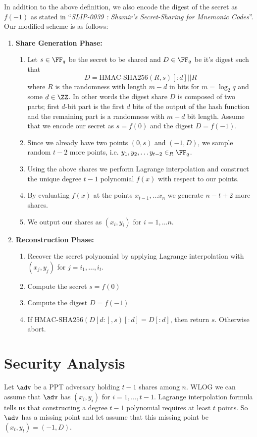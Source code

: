 \documentclass[envcountsame,runningheads,notitlepage]{llncs}
\begin{document}
	In addition to the above definition, we also encode the digest of the secret as $f(-1)$ as stated in ``\textit{SLIP-0039 : Shamir's Secret-Sharing for Mnemonic Codes}''. Our modified scheme is as follows:
	\begin{enumerate}
		\item \textbf{Share Generation Phase:}  
			\begin{enumerate}
				\item Let $s \in \FF_q$ be the secret to be shared and $D \in \FF_q$ be it's digest such that 
				\begin{equation*}
				D = \textrm{HMAC-SHA256}(R,s)[:d] || R
				\end{equation*} 
				where $R$ is the randomness with length $m - d$ in bits for $m = \log_{2}{q}$ and some $d \in \ZZ$. In other words the digest share $D$ is composed of two parts; first $d$-bit part is the first $d$ bits of the output of the hash function and the remaining part is a randomness with $m - d$ bit length. Assume that we encode our secret as $s = f(0)$ and the digest $D = f(-1)$.
				\item Since we already have two points $(0, s)$ and $(-1, D)$, we sample random $t-2$ more points, i.e. $y_{1}, y_{2}, \ldots y_{t-2} \in_{R} \FF_q$.
				\item Using the above shares we perform Lagrange interpolation and construct the unique degree $t - 1$ polynomial $f (x)$ with respect to our points.  
				\item By evaluating $f (x)$ at the points $x_{t - 1}, \ldots x_{n}$ we generate $n - t + 2$ more shares.
				\item We output our shares as $(x_{i},y_{i})$ for $i = 1, \ldots n$.
			\end{enumerate}
		\item \textbf{Reconstruction Phase:}  
			\begin{enumerate}
				\item Recover the secret polynomial by applying Lagrange interpolation with $(x_{j}, y_{j})$ for $j = i_{1}, \ldots, i_{t}$.
				\item Compute the secret $s = f(0)$
				\item Compute the digest $D = f(-1)$
				\item If $\textrm{HMAC-SHA256}(D[d:],s)[:d] = D[:d]$, then return $s$. Otherwise abort. 
			\end{enumerate}
	\end{enumerate}
	
	\section{Security Analysis}
	Let $\adv$ be a PPT adversary holding $t-1$ shares among $n$. WLOG we can assume that $\adv$ has $(x_{i}, y_{i})$ for $i = 1, \ldots, t-1$. Lagrange interpolation formula tells us that constructing a degree $t - 1$ polynomial requires at least $t$ points. So $\adv$ has a missing point and let assume that this missing point be $(x_{t}, y_{t}) = (-1, D)$.
	
\end{document}
